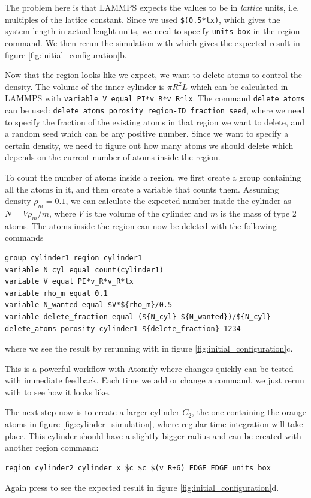 \documentclass[12pt,a4paper,final]{iopart}
\newcommand{\code}[1]{\colorbox{light-gray}{\color{RawSienna}\texttt{#1}}}
\begin{document}
The problem here is that LAMMPS expects the values to be in \textit{lattice} units, i.e. multiples of the lattice constant.
Since we used \code{\$(0.5*lx)}, which gives the system length in actual lenght units, we need to specify \code{units box} in the region command.
We then rerun the simulation with  which gives the expected result in figure \ref{fig:initial_configuration}b.

Now that the region looks like we expect, we want to delete atoms to control the density.
The volume of the inner cylinder is $\pi R^2 L$ which can be calculated in LAMMPS with \code{variable V equal PI*v\_R*v\_R*lx}.
The command \code{delete\_atoms} can be used: \code{delete\_atoms porosity region-ID fraction seed},
where we need to specify the fraction of the existing atoms in that region we want to delete, and a random seed which can be any positive number.
Since we want to specify a certain density, we need to figure out how many atoms we
should delete which depends on the current number of atoms inside the region.

To count the number of atoms inside a region, we first create a group containing all the atoms in it, and then create a variable that counts them.
Assuming density $\rho_m = 0.1$, we can calculate the expected number inside the cylinder as $N = V\rho_m/m$,
where $V$ is the volume of the cylinder and $m$ is the mass of type 2 atoms.
The atoms inside the region can now be deleted with the following commands
\begin{lstlisting}
group cylinder1 region cylinder1
variable N_cyl equal count(cylinder1)
variable V equal PI*v_R*v_R*lx
variable rho_m equal 0.1
variable N_wanted equal $V*${rho_m}/0.5
variable delete_fraction equal (${N_cyl}-${N_wanted})/${N_cyl}
delete_atoms porosity cylinder1 ${delete_fraction} 1234
\end{lstlisting}
where we see the result by rerunning with  in figure \ref{fig:initial_configuration}c.

This is a powerful workflow with Atomify where changes quickly can be tested with immediate feedback.
Each time we add or change a command, we just rerun with  to see how it looks like.

The next step now is to create a larger cylinder $C_2$, the one containing the orange atoms in
figure \ref{fig:cylinder_simulation}, where regular time integration will take place.
This cylinder should have a slightly bigger radius and can be created with another region command:
\begin{lstlisting}
region cylinder2 cylinder x $c $c $(v_R+6) EDGE EDGE units box
\end{lstlisting}
Again press  to see the expected result in figure \ref{fig:initial_configuration}d.
\end{document}
